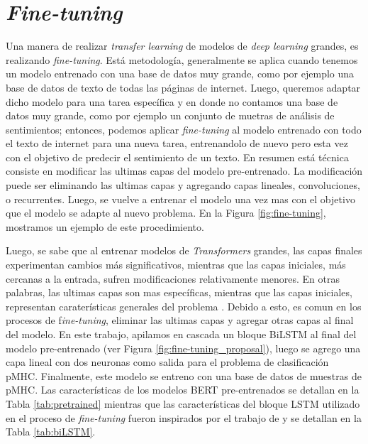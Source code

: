 \section{\textit{Fine-tuning}}\label{sec:fine-tuned}

Una manera de realizar \textit{transfer learning} de modelos de \textit{deep learning} grandes, es realizando \textit{fine-tuning}. Está metodología, generalmente se aplica cuando tenemos un modelo entrenado con una base de datos muy grande, como por ejemplo una base de datos de texto de todas las páginas de internet. Luego, queremos adaptar dicho modelo para una tarea específica y en donde no contamos una base de datos muy grande, como por ejemplo un conjunto de muetras de análisis de sentimientos; entonces, podemos aplicar \textit{fine-tuning} al modelo entrenado con todo el texto de internet para una nueva tarea, entrenandolo de nuevo pero esta vez con el objetivo de predecir el sentimiento de un texto. En resumen está técnica consiste en modificar las ultimas capas del modelo pre-entrenado. La modificación puede ser eliminando las ultimas capas y agregando capas lineales, convoluciones, o recurrentes. Luego, se vuelve a entrenar el modelo una vez mas con el objetivo que el modelo se adapte al nuevo problema. En la Figura \ref{fig:fine-tuning}, mostramos un ejemplo de este procedimiento.

Luego, se sabe que al entrenar modelos de \textit{Transformers} grandes, las capas finales experimentan cambios más significativos, mientras que las capas iniciales, más cercanas a la entrada, sufren modificaciones relativamente menores. En otras palabras, las ultimas capas son mas específicas, mientras que las capas iniciales, representan caraterísticas generales del problema \citep{merchant2020happens,lee2019would,kovaleva2019revealing}. Debido a esto, es comun en los procesos de f\textit{ine-tuning}, eliminar las ultimas capas y agregar otras capas al final del modelo. En este trabajo,  apilamos en cascada un bloque BiLSTM al final del modelo pre-entrenado (ver Figura \ref{fig:fine-tuning_proposal}), luego se agrego una capa lineal con dos neuronas como salida para el problema de clasificación pMHC. Finalmente, este modelo se entreno con una base de datos de muestras de pMHC. Las características de los modelos BERT pre-entrenados se detallan en la Tabla \ref{tab:pretrained} mientras que las características del bloque LSTM utilizado en el proceso de \textit{fine-tuning} fueron inspirados por el trabajo de \cite{zhang2022hlab} y se detallan en la Tabla \ref{tab:biLSTM}.

